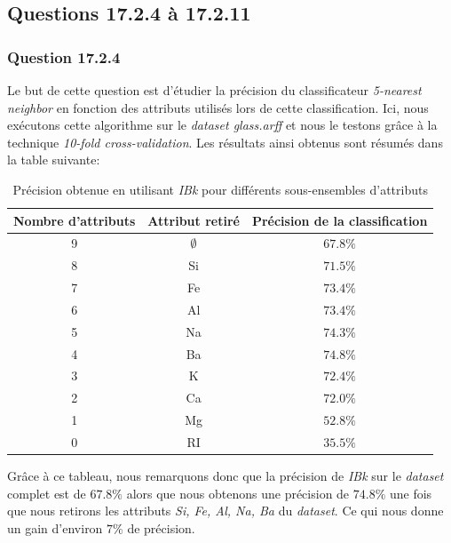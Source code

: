 \documentclass[11pt,a4paper]{article}
\begin{document}
		\subsection{Questions 17.2.4 à 17.2.11}
		
			\subsubsection*{Question 17.2.4}
			
				Le but de cette question est d'étudier la précision du classificateur \textit{5-nearest neighbor} en fonction des attributs utilisés lors de cette classification. Ici, nous exécutons cette algorithme sur le \textit{dataset glass.arff} et nous le testons grâce à la technique \textit{10-fold cross-validation}. Les résultats ainsi obtenus sont résumés dans la table suivante:
				
				\begin{table}[h]
					\centering
					\caption{Précision obtenue en utilisant \textit{IBk} pour différents sous-ensembles d'attributs}
					\begin{tabular}{|c|c|c|}
						\hline
						Nombre d'attributs & Attribut retiré & Précision de la classification\\
						\hline
						9 & $\emptyset$ & $67.8\%$ \\
						\hline
						8 & Si & $71.5\%$ \\
						\hline
						7 & Fe & $73.4\%$ \\
						\hline
						6 & Al & $73.4\%$ \\
						\hline
						5 & Na & $74.3\%$ \\
						\hline
						4 & Ba & $74.8\%$ \\
						\hline
						3 & K & $72.4\%$ \\
						\hline
						2 & Ca & $72.0\%$ \\
						\hline
						1 & Mg & $52.8\%$ \\
						\hline
						0 & RI & $35.5\%$\\
						\hline
					\end{tabular}
				\end{table}
				
				Grâce à ce tableau, nous remarquons donc que la précision de \textit{IBk} sur le \textit{dataset} complet est de $67.8\%$ alors que nous obtenons une précision de $74.8\%$ une fois que nous retirons les attributs \textit{Si, Fe, Al, Na, Ba} du \textit{dataset}. Ce qui nous donne un gain d'environ $7\%$ de précision.
			
\end{document}
